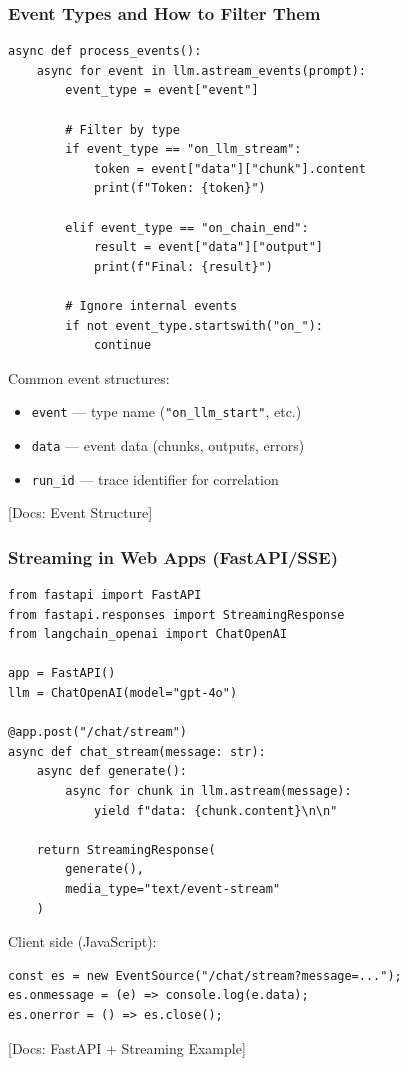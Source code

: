 \documentclass[aspectratio=169,11pt]{beamer}
\newcommand{\docref}[1]{{\scriptsize\color{docgray}[Docs: #1]}}
\begin{document}
\begin{frame}[fragile]
  \frametitle{Event Types and How to Filter Them}

  \begin{lstlisting}
async def process_events():
    async for event in llm.astream_events(prompt):
        event_type = event["event"]

        # Filter by type
        if event_type == "on_llm_stream":
            token = event["data"]["chunk"].content
            print(f"Token: {token}")

        elif event_type == "on_chain_end":
            result = event["data"]["output"]
            print(f"Final: {result}")

        # Ignore internal events
        if not event_type.startswith("on_"):
            continue
  \end{lstlisting}

  \vspace{0.1cm}

  Common event structures:
  \begin{itemize}
    \setlength{\itemsep}{1pt}
    \item \texttt{event} — type name (\texttt{"on\_llm\_start"}, etc.)
    \item \texttt{data} — event data (chunks, outputs, errors)
    \item \texttt{run\_id} — trace identifier for correlation
  \end{itemize}

  \docref{Event Structure}
\end{frame}


\begin{frame}[fragile]
  \frametitle{Streaming in Web Apps (FastAPI/SSE)}

  \begin{lstlisting}
from fastapi import FastAPI
from fastapi.responses import StreamingResponse
from langchain_openai import ChatOpenAI

app = FastAPI()
llm = ChatOpenAI(model="gpt-4o")

@app.post("/chat/stream")
async def chat_stream(message: str):
    async def generate():
        async for chunk in llm.astream(message):
            yield f"data: {chunk.content}\n\n"

    return StreamingResponse(
        generate(),
        media_type="text/event-stream"
    )
  \end{lstlisting}

  \vspace{0.1cm}

  Client side (JavaScript):
  \begin{lstlisting}
const es = new EventSource("/chat/stream?message=...");
es.onmessage = (e) => console.log(e.data);
es.onerror = () => es.close();
  \end{lstlisting}

  \docref{FastAPI + Streaming Example}
\end{frame}
\end{document}
